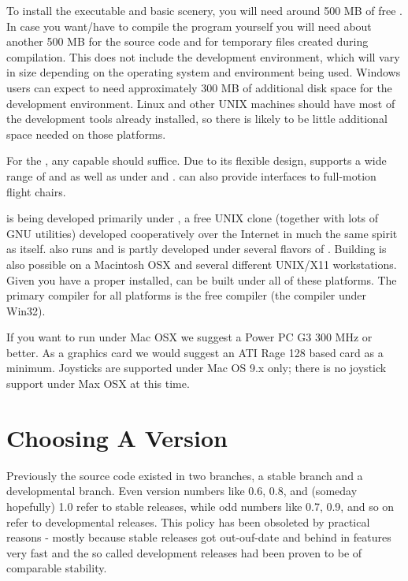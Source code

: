 To install the executable and basic scenery, you will need around 500 MB of free . In case you want/have to compile the program yourself you will need about another
500 MB for the source code and for temporary files created during compilation. This does not
include the development environment, which will vary in size depending on the operating system
and environment being used.  Windows users can expect to need approximately 300 MB of additional
disk space for the development environment.  Linux and other UNIX machines should have most of
the development tools already installed, so there is likely to be little additional space
needed on those platforms.


For the , any capable  should suffice.
Due to its flexible design, \FlightGear{} supports a wide range of  and
 as well as  under  and . 
\FlightGear{} can also provide interfaces to full-motion flight chairs.

\FlightGear{} is being developed primarily under , a free UNIX clone
(together with lots of GNU utilities) developed cooperatively over the Internet in much
the same spirit as \FlightGear{} itself. \FlightGear{} also runs and is partly developed
under several flavors of . Building \FlightGear{} is also possible on a Macintosh OSX
and several different UNIX/X11 workstations. Given you have a proper  installed,
\FlightGear{} can be built under all of these platforms. The primary compiler for all platforms is
the free  compiler (the   compiler under Win32).

If you want to run \FlightGear{} under Mac OSX we suggest a Power PC G3 300 MHz or better. As a
graphics card we would suggest an ATI Rage 128 based card as a minimum. Joysticks are supported
under Mac OS 9.x only; there is no joystick support under Max OSX at this time.


\section{Choosing A Version}

Previously the \FlightGear{} source code existed in two branches, a
stable branch and a developmental branch. Even version numbers like 0.6,
0.8, and (someday hopefully) 1.0 refer to stable releases, while odd
numbers like 0.7, 0.9, and so on refer to developmental releases.
This policy has been obsoleted by practical reasons - mostly because
stable releases got out-ouf-date and behind in features very fast and
the so called development releases had been proven to be of comparable
stability.\label{branches}


